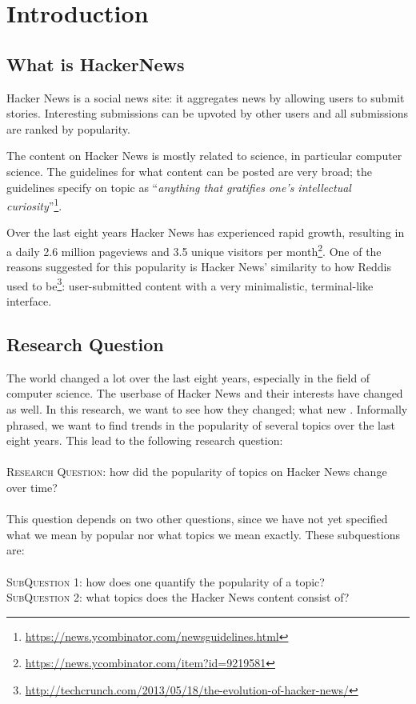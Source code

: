 \section{Introduction}
\subsection{What is HackerNews}
Hacker News is a social news site: it aggregates news by allowing users to submit stories. Interesting submissions can be upvoted by other users and all submissions are ranked by popularity.

The content on Hacker News is mostly related to science, in particular computer science. The guidelines for what content can be posted are very broad; the guidelines specify on topic as ``\textit{anything that gratifies one's intellectual curiosity}''\footnote{\url{https://news.ycombinator.com/newsguidelines.html}}.

Over the last eight years Hacker News has experienced rapid growth, resulting in a daily 2.6 million pageviews and 3.5 unique visitors per month\footnote{\url{https://news.ycombinator.com/item?id=9219581}}. One of the reasons suggested for this popularity is Hacker News' similarity to how Reddis used to be\footnote{\url{http://techcrunch.com/2013/05/18/the-evolution-of-hacker-news/}}: user-submitted content with a very minimalistic, terminal-like interface.

\subsection{Research Question}
The world changed a lot over the last eight years, especially in the field of computer science.  The userbase of Hacker News and their interests have changed as well. In this research, we want to see how they changed; what new . Informally phrased, we want to find trends in the popularity of several topics over the last eight years. This lead to the following research question:\\
\\
\textsc{Research Question:} how did the popularity of topics on Hacker News change over time?\\
\\
This question depends on two other questions, since we have not yet specified what we mean by popular nor what topics we mean exactly. These subquestions are:\\
\\
\textsc{SubQuestion 1:} how does one quantify the popularity of a topic?\\
\textsc{SubQuestion 2:} what topics does the Hacker News content consist of?\\

